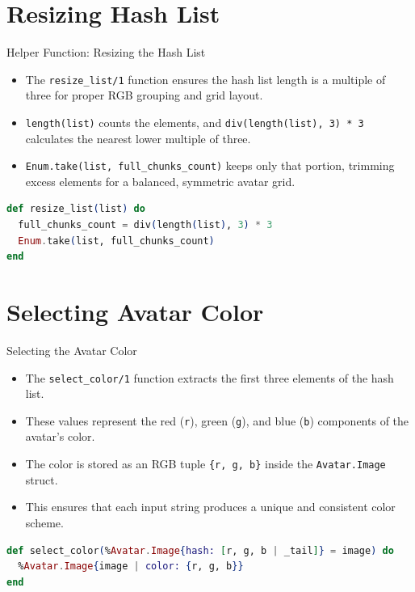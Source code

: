 \documentclass[aspectratio=169, table]{beamer}
\begin{document}
\section{Resizing Hash List}
\begin{frame}[fragile]{Helper Function: Resizing the Hash List}
\small
\begin{itemize}
  \item The \texttt{resize\_list/1} function ensures the hash list length is a multiple of three for proper RGB grouping and grid layout.
  \item \texttt{length(list)} counts the elements, and \texttt{div(length(list), 3) * 3} calculates the nearest lower multiple of three.
  \item \texttt{Enum.take(list, full\_chunks\_count)} keeps only that portion, trimming excess elements for a balanced, symmetric avatar grid.
\end{itemize}

\begin{lstlisting}[language=Elixir, basicstyle=\ttfamily\small]
def resize_list(list) do
  full_chunks_count = div(length(list), 3) * 3
  Enum.take(list, full_chunks_count)
end
\end{lstlisting}
\end{frame}

\section{Selecting Avatar Color}
\begin{frame}[fragile]{Selecting the Avatar Color}
\small
\begin{itemize}
  \item The \texttt{select\_color/1} function extracts the first three elements of the hash list.
  \item These values represent the red (\texttt{r}), green (\texttt{g}), and blue (\texttt{b}) components of the avatar’s color.
  \item The color is stored as an RGB tuple \texttt{\{r, g, b\}} inside the \texttt{Avatar.Image} struct.
  \item This ensures that each input string produces a unique and consistent color scheme.
\end{itemize}

\begin{lstlisting}[language=Elixir, basicstyle=\ttfamily\footnotesize]
def select_color(%Avatar.Image{hash: [r, g, b | _tail]} = image) do
  %Avatar.Image{image | color: {r, g, b}}
end
\end{lstlisting}
\end{frame}
\end{document}
